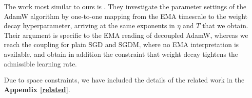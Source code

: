 The work most similar to ours is \cite{wang2025setadamwsweightdecay}. They investigate the parameter settings of the AdamW algorithm by one-to-one mapping from the EMA timescale to the weight decay hyperparameter, arriving at the same exponents in $\eta$ and $T$ that we obtain. Their argument is specific to the EMA reading of decoupled AdamW, whereas we reach the coupling for plain SGD and SGDM, where no EMA interpretation is available, and obtain in addition the constraint that weight decay tightens the admissible learning rate.

Due to space constraints, we have included the details of the related work in the \textbf{Appendix \ref{related}}.
